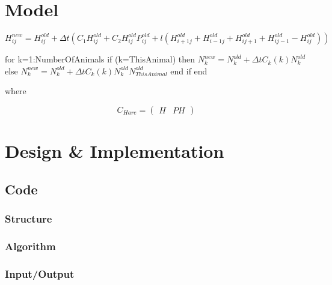 \documentclass[11pt]{report}
\begin{document}
\chapter{Model} %

$H_{ij}^{new}=H_{ij}^{old} + {\Delta}t(C_{1}H_{ij}^{old}+C_{2}H_{ij}^{old}P_{ij}^{old} + l(H_{i+1j}^{old} + H_{i-1j}^{old} + H_{ij+1}^{old} + H_{ij-1}^{old}-H_{ij}^{old}))$


\vspace{30 mm}

\noindent for k=1:NumberOfAnimals\newline{}
if (k=ThisAnimal) then\newline{}
$N_{k}^{new}=N_{k}^{old} + {\Delta}tC_{k}(k)N_{k}^{old}$\newline{}
else\newline{}
$N_{k}^{new}=N_{k}^{old} + {\Delta}tC_{k}(k)N_{k}^{old}N_{ThisAnimal}^{old}$\newline{}
end if\newline{}
end

where

\[ C_{Hare} = \left( \begin{array}{cc}
H & PH \end{array} \right)\]    


\chapter{Design \& Implementation}
   \section{Code}
      \subsection{Structure} %
      \subsection{Algorithm} %
      \subsection{Input/Output} %
      
          
       
      
\end{document}
